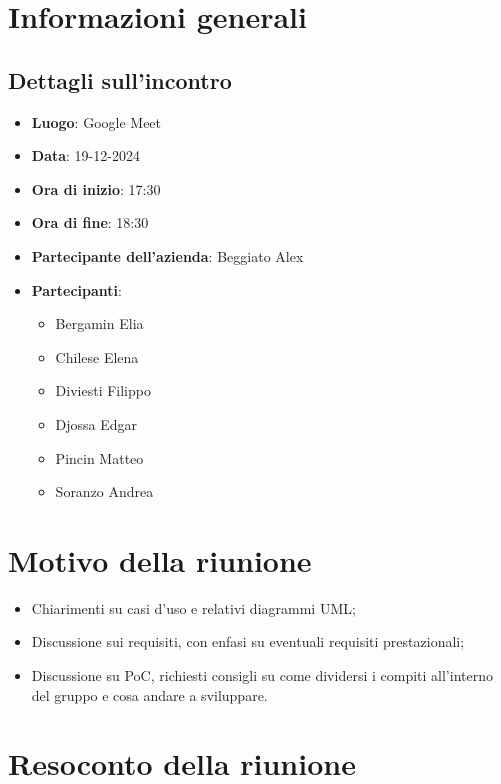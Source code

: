 \section{Informazioni generali}
\subsection{Dettagli sull'incontro}
\begin{itemize}
    \item \textbf{Luogo}: Google Meet
    \item \textbf{Data}: 19-12-2024
    \item \textbf{Ora di inizio}: 17:30
    \item \textbf{Ora di fine}: 18:30
    \item \textbf{Partecipante dell'azienda}: Beggiato Alex
    \item \textbf{Partecipanti}:
    \begin{itemize}
        \item Bergamin Elia
        \item Chilese Elena
        \item Diviesti Filippo
        \item Djossa Edgar
        \item Pincin Matteo 
        \item Soranzo Andrea  
    \end{itemize}
\end{itemize}

\section{Motivo della riunione}
\begin{itemize}
    \item Chiarimenti su casi d'uso e relativi diagrammi UML;
    \item Discussione sui requisiti, con enfasi su eventuali requisiti prestazionali;
    \item Discussione su PoC, richiesti consigli su come dividersi i compiti all'interno del gruppo e cosa andare a sviluppare.
\end{itemize}

\section{Resoconto della riunione}
